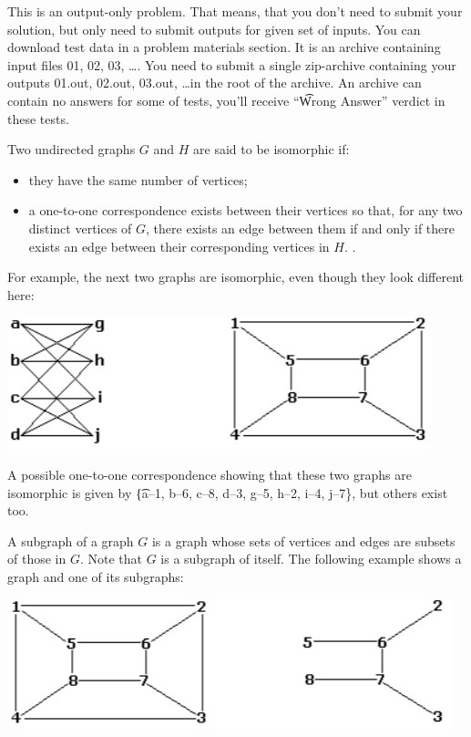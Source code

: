 This is an output-only problem. That means, that you don't need to submit your solution, but only need to submit outputs for given set of inputs. You can download test data in a problem materials section. It is an archive containing input files 01, 02, 03, \dots. You need to submit a single zip-archive containing your outputs 01.out, 02.out, 03.out, \dots in the root of the archive.  An archive can contain no answers for some of tests, you'll receive ``\t{Wrong Answer}'' verdict in these tests.

Two undirected graphs $G$ and $H$ are said to be isomorphic if: 

\begin{itemize}
    \item they have the same number of vertices;
    \item a one-to-one correspondence exists between their vertices so that, for any two distinct vertices of $G$, there exists an edge between them if and only if there exists an edge between their corresponding vertices in $H$. .
\end{itemize}

For example, the next two graphs are isomorphic, even though they look different here: 

\begin{center}
\includegraphics{pic1.png}
\end{center}

A possible one-to-one correspondence showing that these two graphs are isomorphic is given by \t{\{a--1, b--6, c--8, d--3, g--5, h--2, i--4, j--7\}},
but others exist too.

A subgraph of a graph $G$ is a graph whose sets of vertices and edges are subsets of those in $G$. Note that $G$ is a subgraph of itself. The following example shows a graph and one of its subgraphs:

\begin{center}
\includegraphics{pic2.png}
\end{center}

